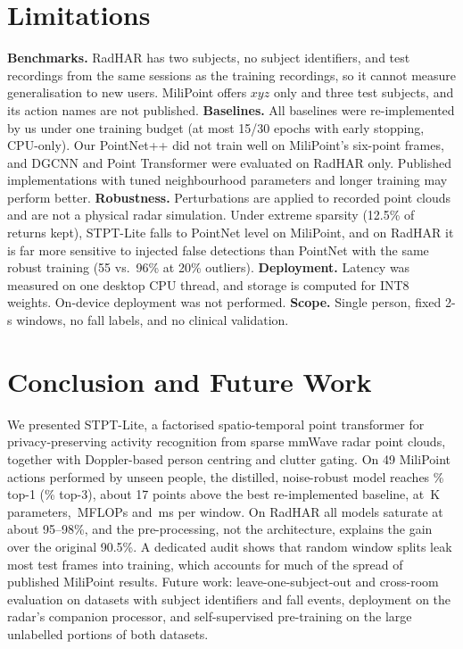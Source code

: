 \section{Limitations}
\textbf{Benchmarks.} RadHAR has two subjects, no subject identifiers, and test
recordings from the same sessions as the training recordings, so it cannot
measure generalisation to new users. MiliPoint offers $xyz$ only and three test
subjects, and its action names are not published. \textbf{Baselines.} All
baselines were re-implemented by us under one training budget (at most 15/30
epochs with early stopping, CPU-only). Our PointNet++ did not train well on
MiliPoint's six-point frames, and DGCNN and Point Transformer were evaluated on
RadHAR only. Published implementations with tuned neighbourhood
parameters and longer training may perform better. \textbf{Robustness.}
Perturbations are applied to recorded point clouds and are not a physical radar
simulation. Under extreme sparsity (12.5\% of returns kept), STPT-Lite falls to
PointNet level on MiliPoint, and on RadHAR it is far more sensitive to injected
false detections than PointNet with the same robust training (55 vs.\ 96\% at
20\% outliers). \textbf{Deployment.} Latency was measured on one desktop CPU
thread, and storage is computed for INT8 weights. On-device deployment was not
performed. \textbf{Scope.} Single person, fixed 2-s windows, no fall labels,
and no clinical validation.

\section{Conclusion and Future Work}
We presented STPT-Lite, a factorised spatio-temporal point transformer for
privacy-preserving activity recognition from sparse mmWave radar point clouds,
together with Doppler-based person centring and clutter gating. On 49 MiliPoint
actions performed by unseen people, the distilled, noise-robust model reaches
\mistptlitekdrobustAcc\% top-1 (\mistptlitekdrobustTopthree\% top-3), about 17 points above the best re-implemented baseline, at
\oursParamsK\,K parameters, \oursMflops\,MFLOPs and \oursLat\,ms per window. On
RadHAR all models saturate at about 95--98\%, and the pre-processing, not the
architecture, explains the gain over the original 90.5\%. A dedicated audit
shows that random window splits leak most test frames into training, which
accounts for much of the spread of published MiliPoint results. Future work:
leave-one-subject-out and cross-room evaluation on datasets with subject
identifiers and fall events, deployment on the radar's companion processor, and
self-supervised pre-training on the large unlabelled portions of both datasets.
